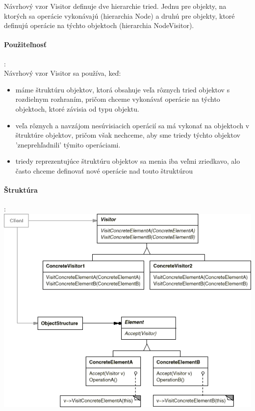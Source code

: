		Návrhový vzor Visitor definuje dve hierarchie tried. Jednu pre objekty, na ktorých sa operácie vykonávajú (hierarchia Node) a druhú pre objekty, ktoré definujú operácie na týchto objektoch (hierarchia NodeVisitor).

		\paragraph{Použiteľnosť}:\\
		Návrhový vzor Visitor sa používa, keď:
			\begin{itemize}
				\item máme štruktúru objektov, ktorá obsahuje veľa rôznych tried objektov s rozdielnym rozhraním, pričom chceme vykonávať operácie na týchto objektoch, ktoré závisia od typu objektu.
				\item veľa rôznych a navzájom nesúvisiacich operácií sa má vykonať na objektoch v štruktúre objektov, pričom však nechceme, aby sme triedy týchto objektov 'zneprehľadnili' týmito operáciami.
				\item triedy reprezentujúce štruktúru objektov sa menia iba veľmi zriedkavo, alo často chceme definovať nové operácie nad touto štruktúrou
			\end{itemize}
		\paragraph{Štruktúra}:\\
			\includegraphics[width=.9\textwidth]{images/visitor3}

